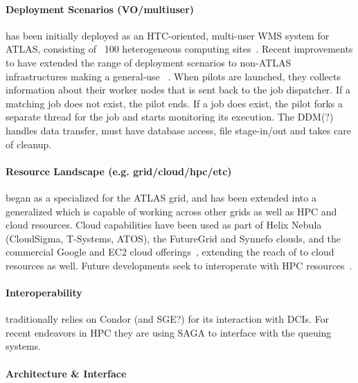 \documentclass{sig-alternate}
\begin{document}
\paragraph{Deployment Scenarios (VO/multiuser)}

\panda has been initially deployed as an HTC-oriented, multi-user WMS system
for ATLAS, consisting of ~100 heterogeneous computing
sites~\cite{maeno_pd2p:_2012}. Recent improvements to \panda have extended the
range of deployment scenarios to non-ATLAS infrastructures making \panda a
general-use \pilotjob~\cite{nilsson2012recent}. When pilots are launched, they
collects information about their worker nodes that is sent back to the job
dispatcher. If a matching job does not exist, the pilot ends. If a job does
exist, the pilot forks a separate thread for the job and starts monitoring its
execution. The DDM(?) handles data transfer, must have database access, file
stage-in/out and takes care of cleanup.

\paragraph{Resource Landscape (e.g. grid/cloud/hpc/etc)}

\panda began as a specialized \pilotjob for the ATLAS grid, and has been
extended into a generalized \pilotjob which is capable of working across other
grids as well as HPC and cloud resources. Cloud
capabilities have been used as part of Helix Nebula (CloudSigma, T-Systems,
ATOS), the FutureGrid and Synnefo clouds, and the commercial Google and EC2
cloud offerings~\cite{pandapresentation2013-06}, extending the reach of
\panda to cloud resources as well. Future \panda developments seek to
interoperate with HPC resources~\cite{pandapresentation2013-06}.

\paragraph{Interoperability}

\panda traditionally relies on Condor (and SGE?) for its interaction with DCIs.
For recent endeavors in HPC they are using SAGA to interface with the queuing
systems.

\paragraph{Architecture \& Interface}
\end{document}
